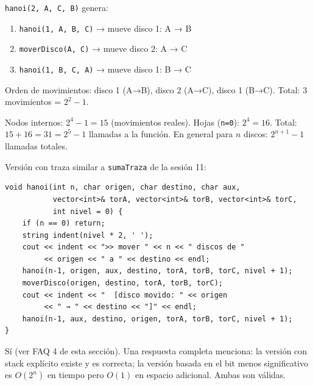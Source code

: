 \documentclass[12pt, oneside]{article}
\begin{document}
\begin{notaprofesor}[Ejercicio 1 — Árbol de recursión para $n=2$]
  \texttt{hanoi(2, A, C, B)} genera:
  \begin{enumerate}
    \item \texttt{hanoi(1, A, B, C)} → mueve disco 1: A → B
    \item \texttt{moverDisco(A, C)} → mueve disco 2: A → C
    \item \texttt{hanoi(1, B, C, A)} → mueve disco 1: B → C
  \end{enumerate}
  Orden de movimientos: disco 1 (A→B), disco 2 (A→C), disco 1 (B→C).
  Total: 3 movimientos = $2^2 - 1$.
\end{notaprofesor}

\begin{notaprofesor}[Ejercicio 2 — Llamadas totales para $n=4$]
  Nodos internos: $2^4 - 1 = 15$ (movimientos reales).
  Hojas (\texttt{n=0}): $2^4 = 16$.
  Total: $15 + 16 = 31 = 2^5 - 1$ llamadas a la función.
  En general para $n$ discos: $2^{n+1} - 1$ llamadas totales.
\end{notaprofesor}

\begin{notaprofesor}
  Versión con traza similar a \texttt{sumaTraza} de la sesión 11:
\begin{verbatim}
void hanoi(int n, char origen, char destino, char aux,
           vector<int>& torA, vector<int>& torB, vector<int>& torC,
           int nivel = 0) {
    if (n == 0) return;
    string indent(nivel * 2, ' ');
    cout << indent << ">> mover " << n << " discos de "
         << origen << " a " << destino << endl;
    hanoi(n-1, origen, aux, destino, torA, torB, torC, nivel + 1);
    moverDisco(origen, destino, torA, torB, torC);
    cout << indent << "  [disco movido: " << origen
         << " → " << destino << "]" << endl;
    hanoi(n-1, aux, destino, origen, torA, torB, torC, nivel + 1);
}
\end{verbatim}
\end{notaprofesor}

\begin{notaprofesor}
  Sí (ver FAQ 4 de esta sección).  Una respuesta completa menciona:
  la versión con stack explícito existe y es correcta; la versión basada
  en el bit menos significativo es $O(2^n)$ en tiempo pero $O(1)$ en
  espacio adicional.  Ambas son válidas.
\end{notaprofesor}
\end{document}

